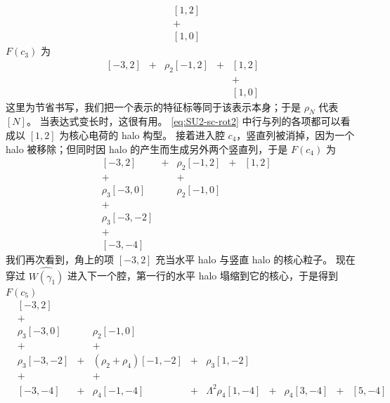 \begin{equation}\label{eq:SU2-sc-rot1}
\begin{array}{cc}
 &[1,2]\\
 &+ \\
 & [1,0]
\end{array}
\end{equation}
%
$F(c_3)$ 为
%
\begin{equation}\label{eq:SU2-sc-rot2}
 \begin{array}{ccccc}
   [-3,2] & + & \rho_2 [-1,2] &  + & [1,2]\\
    &  & &  & +\\
    & &  & & [1,0]
  \end{array}
 \end{equation}
%
这里为节省书写，我们把一个表示的特征标等同于该表示本身；于是 $\rho_N$ 代表 $[N]$。
当表达式变长时，这很有用。
\eqref{eq:SU2-sc-rot2} 中行与列的各项都可以看成以 $[1,2]$ 为核心电荷的 halo 构型。
接着进入腔 $c_4$，竖直列被消掉，因为一个 halo 被移除；但同时因 halo 的产生而生成另外两个竖直列，于是 $F(c_4)$ 为
%
\begin{equation}
\begin{array}{cccccc}
  &[-3,2] & + & \rho_2 [-1,2] & + & [1,2] \\
     &  + &   & + &   &   \\
 & \rho_3 [-3,0] &   & \rho_2 [-1,0] &  &  \\
  &+ &  &   &   &   \\
  & \rho_3 [-3,-2] &   &   &   &   \\
  &+ &   &  &   &   \\
  &[-3,-4] &   &   &   &
\end{array}
\end{equation}
%
我们再次看到，角上的项 $[-3,2]$ 充当水平 halo 与竖直 halo 的核心粒子。
现在穿过 $\widehat{W(\gamma_1)}$ 进入下一个腔，第一行的水平 halo 塌缩到它的核心，于是得到 $F(c_5)$
%
\begin{equation}
\begin{array}{cccccccccc}
  &[-3,2] &   &   &   &  &   &   &   &   \\
 & + &   &   &   &  &   &   &   &   \\
 & \rho_3 [-3,0] &   & \rho_2 [-1,0] &   &   &   &   &   &   \\
 &  + &   &  + &   &   &   &   &   &   \\
 & \rho_3 [-3,-2] & + & (\rho_2+\rho_4)[-1,-2] & + & \rho_3[1,-2] &   &   &   &   \\
 &  + &   &  + &   &   &   &   &   &   \\
 & [-3,-4] & +& \rho_4 [-1,-4] & + & \Lambda^2 \rho_4 [1,-4] & + & \rho_4 [3,-4] & + & [5,-4]
\end{array}
\end{equation}
